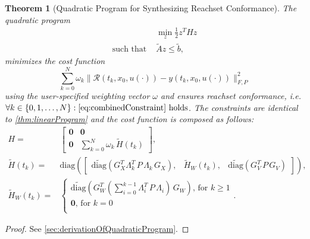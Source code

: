 \documentclass[EPiC]{easychair}
\renewcommand{\^}[1]{^{(#1)}}
\newtheorem{theorem}{Theorem}
\begin{document}
\begin{theorem}[Quadratic Program for Synthesizing Reachset Conformance]
\label{thm:quadraticProgram}
 The quadratic program
 \begin{equation*} 
    \begin{split}
    & \min_z \frac{1}{2} z^T H z \\ %
    \text{such that } & \tilde{A} z \leq \tilde{b},
    \end{split}
 \end{equation*}
 minimizes the cost function 
 \begin{equation} \label{eq:costFunctionFrobenius}
    \sum_{k=0}^{N} \omega_k \|\mathcal{R}(t_k,x_0,u(\cdot)) - y(t_k,x_0,u(\cdot))\|_{F,P}^2
 \end{equation}
 using the user-specified weighting vector $\omega$ and ensures reachset conformance, i.e. $\forall k\in\{0,1,\ldots, N\}:  \eqref{eq:combinedConstraint} \text{ holds}$. The constraints are identical to \cref{thm:linearProgram} and the cost function is composed as follows:
 \begin{align}
  \label{eq:H}
  H =& \begin{bmatrix} \mathbf{0} & \mathbf{0} \\
    \mathbf{0} & \sum_{k=0}^{N} \omega_k \, \tilde{H}(t_k) \end{bmatrix}, \\
 \label{eq:H_tilde}
  \tilde{H}(t_k) =& \mathrm{diag}\left(\begin{bmatrix} 
  \widetilde{\mathrm{diag}}\left(G_X^T \Lambda_k^T \, P \, \Lambda_k  \, G_X \right), &
  \tilde{H}_W(t_k), &
  \widetilde{\mathrm{diag}}\left(G_V^T \, P \, G_V \right)\end{bmatrix} \right), \\
  \label{eq:H_tilde_W}
 \tilde{H}_W(t_k) =& \begin{cases}
  \widetilde{\mathrm{diag}}\left(G_W^T (\sum_{i=0}^{k-1} \Lambda_i^T \, P \, \Lambda_i)  \, G_W \right) \text{, for } k\geq1 \\
  \mathbf{0} \text{, for } k=0 \\
                    \end{cases} .
  \end{align}
\end{theorem}
\begin{proof}
 See \cref{sec:derivationOfQuadraticProgram}.
\end{proof}
\end{document}
